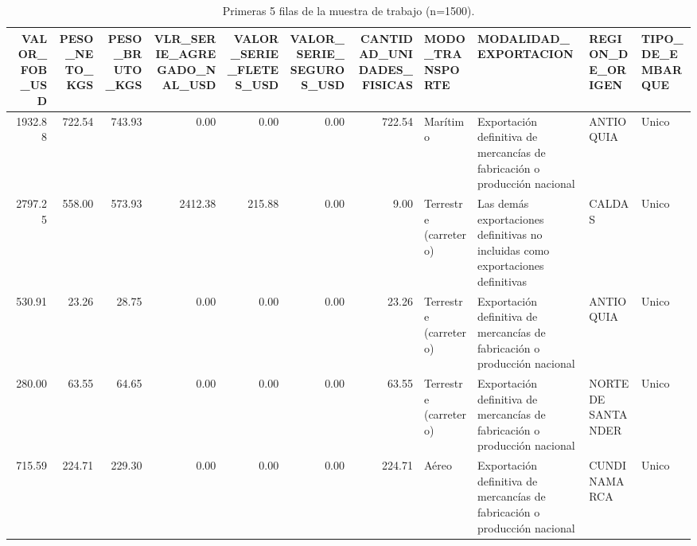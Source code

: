 \begin{table}
\caption{Primeras 5 filas de la muestra de trabajo (n=1500).}
\label{tab:muestra_head}
\begin{tabular}{rrrrrrrllll}
\toprule
VALOR_FOB_USD & PESO_NETO_KGS & PESO_BRUTO_KGS & VLR_SERIE_AGREGADO_NAL_USD & VALOR_SERIE_FLETES_USD & VALOR_SERIE_SEGUROS_USD & CANTIDAD_UNIDADES_FISICAS & MODO_TRANSPORTE & MODALIDAD_EXPORTACION & REGION_DE_ORIGEN & TIPO_DE_EMBARQUE \\
\midrule
1932.88 & 722.54 & 743.93 & 0.00 & 0.00 & 0.00 & 722.54 & Marítimo & Exportación definitiva de mercancías de fabricación o producción nacional & ANTIOQUIA & Unico \\
2797.25 & 558.00 & 573.93 & 2412.38 & 215.88 & 0.00 & 9.00 & Terrestre (carretero) & Las demás exportaciones definitivas no incluidas como exportaciones definitivas & CALDAS & Unico \\
530.91 & 23.26 & 28.75 & 0.00 & 0.00 & 0.00 & 23.26 & Terrestre (carretero) & Exportación definitiva de mercancías de fabricación o producción nacional & ANTIOQUIA & Unico \\
280.00 & 63.55 & 64.65 & 0.00 & 0.00 & 0.00 & 63.55 & Terrestre (carretero) & Exportación definitiva de mercancías de fabricación o producción nacional & NORTE DE SANTANDER & Unico \\
715.59 & 224.71 & 229.30 & 0.00 & 0.00 & 0.00 & 224.71 & Aéreo & Exportación definitiva de mercancías de fabricación o producción nacional & CUNDINAMARCA & Unico \\
\bottomrule
\end{tabular}
\end{table}
